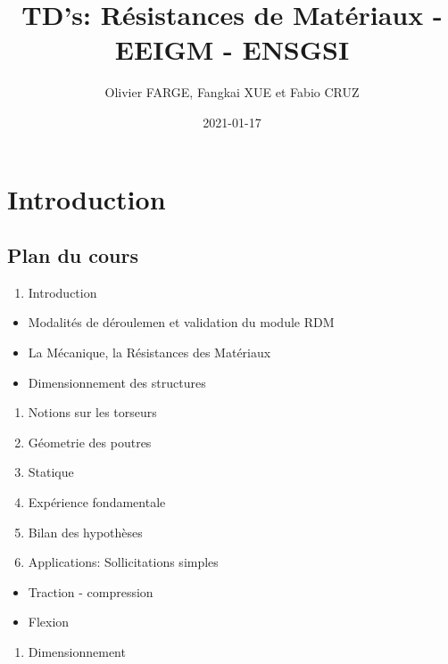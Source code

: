 \documentclass[
]{book}
\title{TD's: Résistances de Matériaux - EEIGM - ENSGSI}
\author{Olivier FARGE, Fangkai XUE et Fabio CRUZ}
\date{2021-01-17}
\providecommand{\tightlist}{%
  \setlength{\itemsep}{0pt}\setlength{\parskip}{0pt}}
\begin{document}
\maketitle

{
\setcounter{tocdepth}{1}
\tableofcontents
}
\hypertarget{introduction}{%
\chapter*{Introduction}\label{introduction}}

\hypertarget{plan-du-cours}{%
\section*{Plan du cours}\label{plan-du-cours}}

\begin{enumerate}
\def\labelenumi{\arabic{enumi}.}
\tightlist
\item
  Introduction
\end{enumerate}

\begin{itemize}
\tightlist
\item
  Modalités de déroulemen et validation du module RDM
\item
  La Mécanique, la Résistances des Matériaux
\item
  Dimensionnement des structures
\end{itemize}

\begin{enumerate}
\def\labelenumi{\arabic{enumi}.}
\tightlist
\item
  Notions sur les torseurs
\item
  Géometrie des poutres
\item
  Statique
\item
  Expérience fondamentale
\item
  Bilan des hypothèses
\item
  Applications: Sollicitations simples
\end{enumerate}

\begin{itemize}
\tightlist
\item
  Traction - compression
\item
  Flexion
\end{itemize}

\begin{enumerate}
\def\labelenumi{\arabic{enumi}.}
\tightlist
\item
  Dimensionnement
\end{enumerate}
\end{document}
